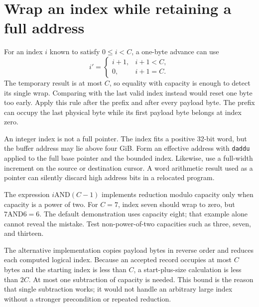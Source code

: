 \section{Wrap an index while retaining a full address}
For an index \(i\) known to satisfy \(0\leq i<C\), a one-byte advance can use
\[
  i'=\begin{cases}i+1,&i+1<C,\\0,&i+1=C.\end{cases}
\]
The temporary result is at most \(C\), so equality with capacity is enough to
detect its single wrap. Comparing with the last valid index instead would reset
one byte too early. Apply this rule after the prefix and after every payload byte.
The prefix can occupy the last physical byte while its first payload byte belongs
at index zero.

An integer index is not a full pointer. The index fits a positive 32-bit word,
but the buffer address may lie above four GiB. Form an effective address with
\texttt{daddu} applied to the full base pointer and the bounded index. Likewise,
use a full-width increment on the source or destination cursor. A word arithmetic
result used as a pointer can silently discard high address bits in a relocated
program.

The expression \(i\mathbin{\mathrm{AND}}(C-1)\) implements reduction modulo capacity
only when capacity is a power of two. For \(C=7\), index seven should wrap to zero,
but \(7\mathbin{\mathrm{AND}}6=6\). The default demonstration uses capacity eight;
that example alone cannot reveal the mistake. Test non-power-of-two capacities
such as three, seven, and thirteen.

The alternative implementation copies payload bytes in reverse order and reduces
each computed logical index. Because an accepted record occupies at most \(C\)
bytes and the starting index is less than \(C\), a start-plus-size calculation is
less than \(2C\). At most one subtraction of capacity is needed. This bound is the
reason that single subtraction works; it would not handle an arbitrary large
index without a stronger precondition or repeated reduction.

